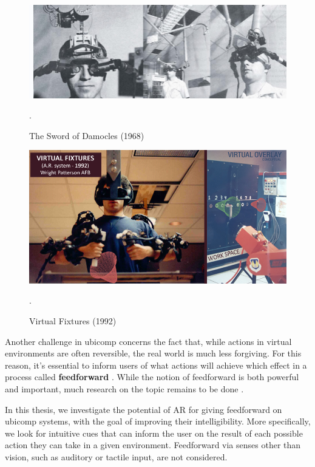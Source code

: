 \begin{figure}
    \centering
    \includegraphics[width=1.0\linewidth]{resources/introduction/sword_of_damocles.jpg}
    \caption{The Sword of Damocles (1968) \cite{sutherland1968head}}.
    \label{fig:sword_of_damocles}
\end{figure}

\cite{rosenberg1992use}

\begin{figure}
    \centering
    \includegraphics[width=1.0\linewidth]{resources/introduction/virtual_fixtures.jpg}
    \caption{Virtual Fixtures (1992) \cite{sutherland1968head}}.
    \label{fig:virtual_fixtures}
\end{figure}


Another challenge in ubicomp concerns the fact that, while actions in virtual environments are often reversible, the real world is much less forgiving. For this reason, it's essential to inform users of what actions will achieve which effect in a process called \textbf{feedforward} \cite{djajadiningrat2002but}. While the notion of feedforward is both powerful and important, much research on the topic remains to be done \cite{vermeulen2013crossing}.

In this thesis, we investigate the potential of AR for giving feedforward on ubicomp systems, with the goal of improving their intelligibility. More specifically, we look for intuitive cues that can inform the user on the result of each possible action they can take in a given environment. Feedforward via senses other than vision, such as auditory or tactile input, are not considered.

